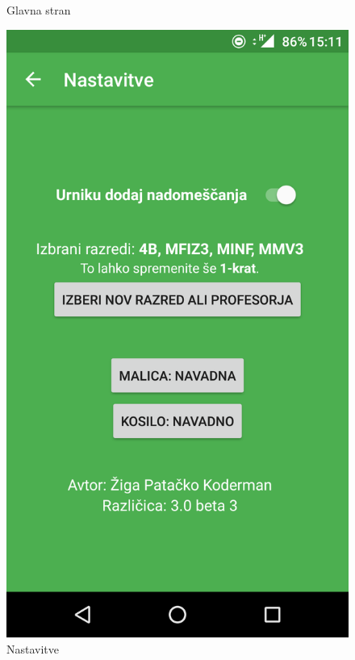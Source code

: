 \begin{figure}[!htb]
  \caption{Glavna stran}\label{fig:main_activity}
\endminipage\hfill
{}
  \includegraphics[width=\linewidth]{images/settings.png}
  \caption{Nastavitve}\label{fig:settings_activity}
\endminipage\hfill
{}%

\end{figure}
